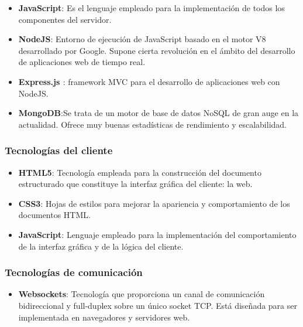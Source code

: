 \begin{itemize}
\item {\bf JavaScript}: Es el lenguaje empleado para la implementación de todos los componentes del servidor.
\item {\bf NodeJS}: Entorno de ejecución de JavaScript basado en el motor V8 desarrollado por Google. Supone cierta revolución en el ámbito del desarrollo de aplicaciones web de tiempo real.
\item {\bf Express.js \cite{Visionmedia}}: framework MVC para el desarrollo de aplicaciones web con NodeJS.
\item {\bf MongoDB}:Se trata de un motor de base de datos NoSQL de gran auge en la actualidad. Ofrece muy buenas estadísticas de rendimiento y escalabilidad.
\end{itemize}


\subsubsection{Tecnologías del cliente}

\begin{itemize}
\item {\bf HTML5}: Tecnología empleada para la construcción del documento estructurado que constituye la interfaz gráfica del cliente: la web.
\item {\bf CSS3}: Hojas de estilos para mejorar la apariencia y comportamiento de los documentos HTML.
\item {\bf JavaScript}: Lenguaje empleado para la implementación del comportamiento de la interfaz gráfica y de la lógica del cliente.
\end{itemize}

\subsubsection{Tecnologías de comunicación}

\begin{itemize}
\item {\bf Websockets}: Tecnología que proporciona un canal de comunicación bidireccional y full-duplex sobre un único socket TCP. Está diseñada para ser implementada en navegadores y servidores web.
\end{itemize}


